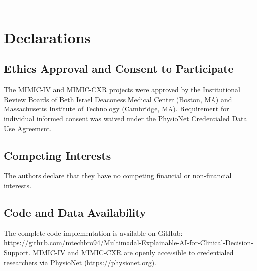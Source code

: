 \documentclass[10pt,journal,compsoc,twocolumn]{IEEEtran}
\begin{document}
---

\section*{Declarations}

\subsection*{Ethics Approval and Consent to Participate}
The MIMIC-IV and MIMIC-CXR projects were approved by the Institutional Review Boards of Beth Israel Deaconess Medical Center (Boston, MA) and Massachusetts Institute of Technology (Cambridge, MA). Requirement for individual informed consent was waived under the PhysioNet Credentialed Data Use Agreement.

\subsection*{Competing Interests}
The authors declare that they have no competing financial or non-financial interests.

\subsection*{Code and Data Availability}
The complete code implementation is available on GitHub: \url{https://github.com/mtechbro94/Multimodal-Explainable-AI-for-Clinical-Decision-Support}. MIMIC-IV and MIMIC-CXR are openly accessible to credentialed researchers via PhysioNet (\url{https://physionet.org}).



\end{document}
